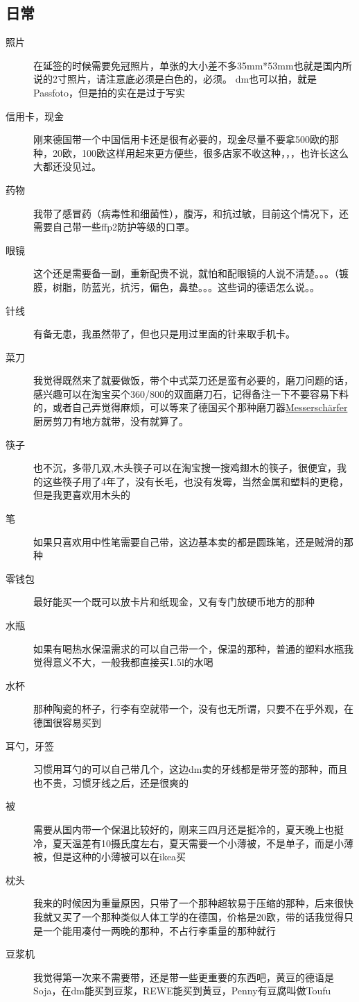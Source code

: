 \documentclass[doku.tex]{subfiles}
\begin{document}
	\subsection{日常}
\begin{description}
		\item[照片] \label{passforo}在延签的时候需要免冠照片，单张的大小差不多35mm*53mm也就是国内所说的2寸照片，请注意底必须是白色的，必须。 dm也可以拍，就是Passfoto，但是拍的实在是过于写实~
		\item[信用卡，现金] 刚来德国带一个中国信用卡还是很有必要的，现金尽量不要拿500欧的那种，20欧，100欧这样用起来更方便些，很多店家不收这种，，，也许长这么大都还没见过。
		\item[药物] 我带了感冒药（病毒性和细菌性），腹泻，和抗过敏，目前这个情况下，还需要自己带一些ffp2防护等级的口罩。
		\item[眼镜] 这个还是需要备一副，重新配贵不说，就怕和配眼镜的人说不清楚。。。（镀膜，树脂，防蓝光，抗污，偏色，鼻垫。。。这些词的德语怎么说。。   
		\item[针线] 有备无患，我虽然带了，但也只是用过里面的针来取手机卡。
		\item[菜刀] 我觉得既然来了就要做饭，带个中式菜刀还是蛮有必要的，磨刀问题的话，感兴趣可以在淘宝买个360/800的双面磨刀石，记得备注一下不要容易下料的，或者自己弄觉得麻烦，可以等来了德国买个那种磨刀器\href{https://www.amazon.de/Limirror-Messersch%C3%A4rfer-Messerschleifer-Messerschaerfer-Vintage-Schwarz/dp/B08JQ5L7NY/ref=sr_1_7?__mk_de_DE=%C3%85M%C3%85%C5%BD%C3%95%C3%91&crid=2IX7ZZKQLY1KK&dchild=1&keywords=messer+versch%C3%A4rfer&qid=1612527983&sprefix=messer+vers%2Caps%2C186&sr=8-7}{Messerschärfer}
		厨房剪刀有地方就带，没有就算了。
		\item[筷子] 也不沉，多带几双,木头筷子可以在淘宝搜一搜鸡翅木的筷子，很便宜，我的这些筷子用了4年了，没有长毛，也没有发霉，当然金属和塑料的更稳，但是我更喜欢用木头的~ \label{chopstick}
		\item[笔] 如果只喜欢用中性笔需要自己带，这边基本卖的都是圆珠笔，还是贼滑的那种
		\item[零钱包] 最好能买一个既可以放卡片和纸现金，又有专门放硬币地方的那种
		\item[水瓶] 如果有喝热水保温需求的可以自己带一个，保温的那种，普通的塑料水瓶我觉得意义不大，一般我都直接买1.5l的水喝
		\item[水杯] 那种陶瓷的杯子，行李有空就带一个，没有也无所谓，只要不在乎外观，在德国很容易买到
		\item[耳勺，牙签] 习惯用耳勺的可以自己带几个，这边dm卖的牙线都是带牙签的那种，而且也不贵，习惯牙线之后，还是很爽的
		\item[被] 需要从国内带一个保温比较好的，刚来三四月还是挺冷的，夏天晚上也挺冷，夏天温差有10摄氏度左右，夏天需要一个小薄被，不是单子，而是小薄被，但是这种的小薄被可以在ikea买
		\item[枕头] 我来的时候因为重量原因，只带了一个那种超软易于压缩的那种，后来很快我就又买了一个那种类似人体工学的在德国，价格是20欧，带的话我觉得只是一个能用凑付一两晚的那种，不占行李重量的那种就行
		\item[豆浆机] 我觉得第一次来不需要带，还是带一些更重要的东西吧，黄豆的德语是Soja，在dm能买到豆浆，REWE能买到黄豆，Penny有豆腐叫做Toufu
		
\end{description}
\end{document}
